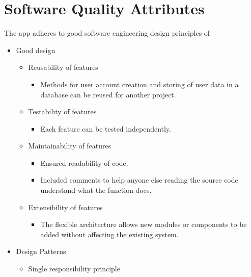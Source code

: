 \documentclass[a4paper]{scrreprt}
\begin{document}
\section{Software Quality Attributes}
The app adheres to good software engineering design principles of
\begin{itemize}
    \item Good design
    \begin{itemize}
        \item Reusability of features
        \begin{itemize}
            \item Methods for user account creation and storing of user data in a database can be reused for another project.
        \end{itemize}
    \end{itemize}
    \begin{itemize}
        \item Testability of features
        \begin{itemize}
            \item Each feature can be tested independently.
        \end{itemize}
    \end{itemize}
    \begin{itemize}
        \item Maintainability of features
        \begin{itemize}
            \item Ensured readability of code.
            \item Included comments to help anyone else reading the source code understand what the function does.
        \end{itemize}
    \end{itemize}
    \begin{itemize}
        \item Extensibility of features
        \begin{itemize}
            \item The flexible architecture allows new modules or components to be added without affecting the existing system.
        \end{itemize}
    \end{itemize}
    \item Design Patterns
    \begin{itemize}
        \item Single responsibility principle
        \begin{itemize}

\end{itemize}
\end{itemize}
\end{itemize}
\end{document}
